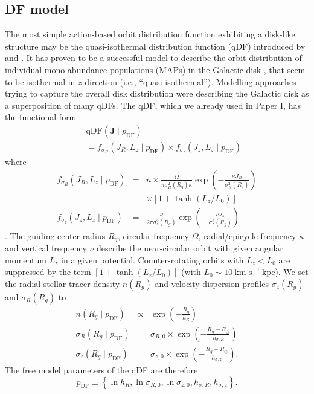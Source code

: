 \documentclass[iop,revtex4,numberedappendix,appendixfloats]{emulateapj}
\newcommand{\vect}[1]{\boldsymbol{#1}}
\begin{document}
\subsection{DF model} \label{sec:DF_model}

The most simple action-based orbit distribution function exhibiting a disk-like structure may be the quasi-isothermal distribution function (qDF) introduced by \citet{2010MNRAS.401.2318B} and \citet{2011MNRAS.413.1889B}. It has proven to be a successful model to describe the orbit distribution of individual mono-abundance populations (MAPs) in the Galactic disk \citep{2013ApJ...779..115B,2013MNRAS.434..652T}, that seem to be isothermal in $z$-direction (i.e., ``quasi-isothermal''). Modelling approaches trying to capture the overall disk distribution \citep{2014MNRAS.445.3133P,2015MNRAS.449.3479S} were describing the Galactic disk as a superposition of many qDFs. The qDF, which we already used in Paper I, has the functional form
\begin{eqnarray}
&&\text{qDF}(\vect{J} \mid p_\text{DF}) \nonumber\\
&&= f_{\sigma_R}\left(J_R,L_z \mid p_\text{DF}\right) \times f_{\sigma_z}\left(J_z,L_z \mid p_\text{DF}\right)\label{eq:df_general}\end{eqnarray}
where
\begin{eqnarray}
f_{\sigma_R}\left(J_R,L_z \mid p_\text{DF}\right) &=& n \times \frac{\Omega}{\pi\sigma_R^2(R_g) \kappa}\exp\left(-\frac{\kappa J_R}{\sigma_R^2(R_g)} \right) \nonumber\\
&& \times \left[1+\tanh\left(L_z/L_0\right) \right]\\
f_{\sigma_z}\left(J_z,L_z \mid p_\text{DF} \right) &=& \frac{\nu}{2 \pi \sigma_z^2(R_g)} \exp\left( -\frac{\nu J_z}{\sigma_z^2(R_g)} \right)
\end{eqnarray}
\citep{2011MNRAS.413.1889B}. The guiding-center radius $R_g$, circular frequency $\Omega$, radial/epicycle frequency $\kappa$ and vertical frequency $\nu$ describe the near-circular orbit with given angular momentum $L_z$ in a given potential. Counter-rotating orbits with $L_z < L_0$ are suppressed by the term $\left[1+\tanh\left(L_z/L_0\right) \right]$ (with $L_0 \sim 10~\text{km s}^{-1}~ \text{kpc}$). 
We set the radial stellar tracer density $n(R_g)$ and velocity dispersion profiles $\sigma_z(R_g)$ and $\sigma_R(R_g)$ to
\begin{eqnarray}
n(R_g \mid p_\text{DF}) &\propto& \exp\left(-\frac{R_g}{h_R} \right)\\
\sigma_R(R_g \mid p_\text{DF}) &=& \sigma_{R,0} \times \exp\left(- \frac{R_g-R_\odot}{h_{\sigma,R}} \right)\label{eq:sigmaRRg}\\
\sigma_z(R_g \mid p_\text{DF}) &=& \sigma_{z,0} \times \exp\left(- \frac{R_g-R_\odot}{h_{\sigma,z}} \right)\label{eq:sigmazRg}.
\end{eqnarray}
The free model parameters of the qDF are therefore
\begin{equation*}
p_\text{DF} \equiv \left\{ \ln h_R, \ln \sigma_{R,0}, \ln \sigma_{z,0}, h_{\sigma,R}, h_{\sigma,z}\right\}.
\end{equation*}
\end{document}
